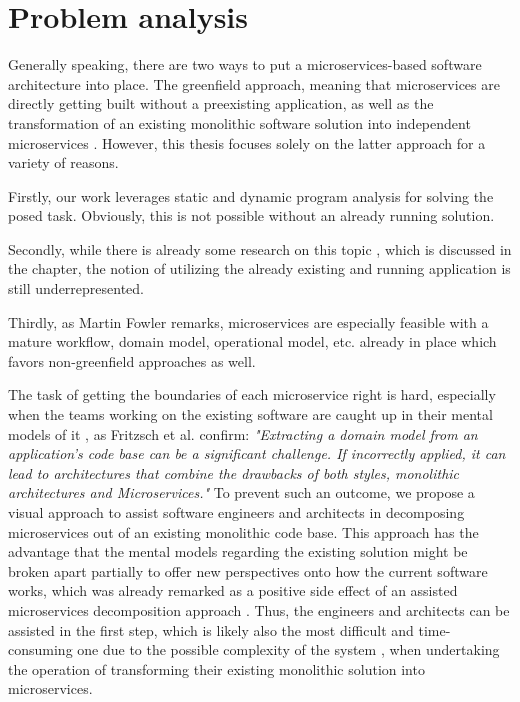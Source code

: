 \documentclass[12pt,a4paper]{report}
\begin{document}
\section{Problem analysis}

Generally speaking, there are two ways to put a microservices-based
software architecture into place. The greenfield approach, meaning that
microservices are directly getting built without a preexisting application,
as well as the transformation of an existing monolithic software solution
into independent microservices \cite{fowler-break-monolith}.
However, this thesis focuses solely on the latter approach for a variety of reasons.

Firstly, our work leverages static and dynamic program analysis for solving
the posed task. Obviously, this is not possible without an already running solution.

Secondly, while there is already some research on this topic \cite{fritzsch2018monolith},
which is discussed in the  chapter, the notion
of utilizing the already existing and running application is still underrepresented.

Thirdly, as Martin Fowler remarks, microservices are especially feasible
with a mature workflow, domain model, operational model, etc. already
in place \cite{fowler-monolith-first} \cite{fowler-microservices-tradeoffs}
which favors non-greenfield approaches as well.

The task of getting the boundaries of each microservice right is hard,
especially when the teams working on the existing software
are caught up in their mental models of it \cite{latoza2006maintaining},
as Fritzsch et al. confirm: \textit{"Extracting a domain model from
an application's code base can be a significant challenge. If incorrectly applied,
it can lead to architectures that combine the drawbacks of both styles,
monolithic architectures and Microservices."}\cite{fritzsch2018monolith}
To prevent such an outcome, we propose a visual approach to assist software engineers
and architects in decomposing microservices out of an existing monolithic code base.
This approach has the advantage that the mental models regarding the existing
solution might be broken apart partially to offer new perspectives onto how
the current software works, which was already remarked as a positive side effect
of an assisted microservices decomposition approach \cite{gysel2016service}.
Thus, the engineers and architects can be assisted in the first step,
which is likely also the most difficult and time-consuming one due to the possible
complexity of the system \cite{fritzsch2018monolith} \cite{france2007model},
when undertaking the operation of transforming their existing
monolithic solution into microservices.
\end{document}
